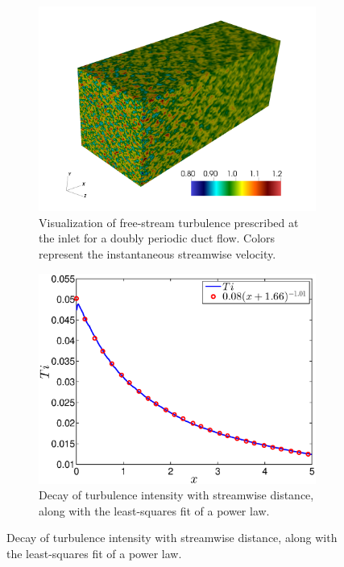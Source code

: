 \begin{figure}[h]
	\centering
	\begin{subfigure}[t]{0.49\textwidth}
		\includegraphics[width=1\textwidth]{fst_duct_vx0000.png}
		\caption{Visualization of free-stream turbulence prescribed at the inlet for a doubly periodic duct flow. Colors represent the instantaneous streamwise velocity.}
		\label{fig:fst_duct}
	\end{subfigure}
	\begin{subfigure}[t]{0.49\textwidth}
		\includegraphics[width=1\textwidth]{ti_decay}
		\caption{Decay of turbulence intensity with streamwise distance, along with the least-squares fit of a power law.}
		\label{fig:ti_decay}
	\end{subfigure}
\end{figure}


